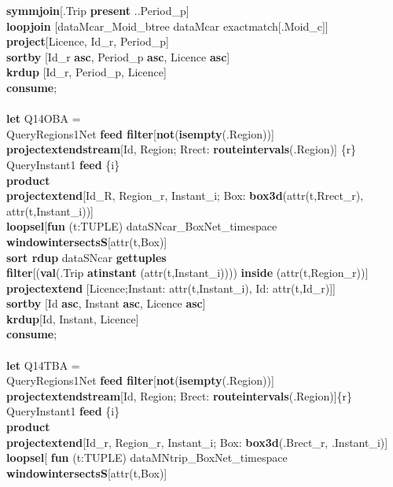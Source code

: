 \documentclass[a4paper]{article}
\newcommand{\op}[1]{\textbf{#1}}
\begin{document}
\begin{scriptsize}
\begin{tabbing}
\>\op{symmjoin}[.Trip \op{present} ..Period\_p]\\
\>\op{loopjoin} [dataMcar\_Moid\_btree dataMcar exactmatch[.Moid\_c]]\\
\>\op{project}[Licence, Id\_r, Period\_p]\\
\>\op{sortby} [Id\_r \op{asc}, Period\_p \op{asc}, Licence \op{asc}]\\
\>\op{krdup} [Id\_r, Period\_p, Licence]\\
\op{consume};\\
\\
\op{let} Q14OBA =\\
\>QueryRegions1Net \op{feed filter}[\op{not}(\op{isempty}(.Region))]\\
\>\op{projectextendstream}[Id, Region; Rrect:  \op{routeintervals}(.Region)]
\{r\}\\
\>QueryInstant1 \op{feed} \{i\}\\
\>\op{product}\\
\>\op{projectextend}[Id\_R, Region\_r, Instant\_i; Box:
\op{box3d}(attr(t,Rrect\_r), attr(t,Instant\_i))]\\
\>\op{loopsel}[\op{fun} (t:TUPLE) dataSNcar\_BoxNet\_timespace
\op{windowintersectsS}[attr(t,Box)]\\
\>\>\op{sort rdup} dataSNcar \op{gettuples}\\
\>\>\op{filter}[(\op{val}(.Trip \op{atinstant} (attr(t,Instant\_i))))
\op{inside} (attr(t,Region\_r))]\\
\>\>\op{projectextend} [Licence;Instant: attr(t,Instant\_i), Id:
attr(t,Id\_r)]]\\
\>\op{sortby} [Id \op{asc}, Instant \op{asc}, Licence \op{asc}]\\
\>\op{krdup}[Id, Instant, Licence]\\
\op{consume};\\
\\
\op{let} Q14TBA =\\
\>QueryRegions1Net \op{feed filter}[\op{not}(\op{isempty}(.Region))]\\
\>\>\op{projectextendstream}[Id, Region; Brect:
\op{routeintervals}(.Region)]\{r\}\\
\>QueryInstant1 \op{feed} \{i\}\\
\>\op{product}\\
\>\op{projectextend}[Id\_r, Region\_r, Instant\_i; Box: \op{box3d}(.Brect\_r,
.Instant\_i)]\\
\>\op{loopsel}[ \op{fun} (t:TUPLE) dataMNtrip\_BoxNet\_timespace
\op{windowintersectsS}[attr(t,Box)]\\

\end{tabbing}
\end{scriptsize}
\end{document}
